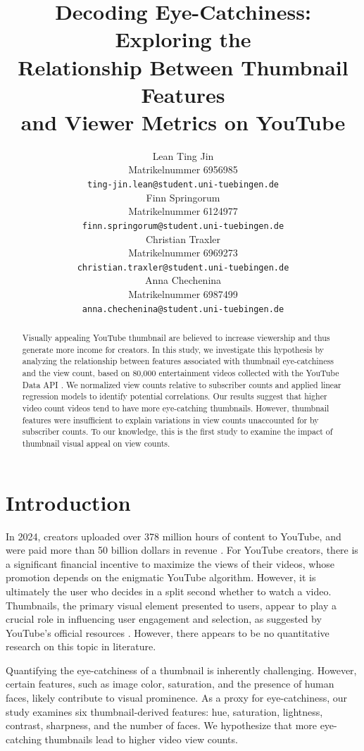 \documentclass{article}
\title{Decoding Eye-Catchiness: Exploring the\\Relationship Between Thumbnail Features\\and Viewer Metrics on YouTube}
\author{%
  Lean Ting Jin\\
  Matrikelnummer 6956985\\
  \fontsize{8.5}{11}\texttt{ting-jin.lean@student.uni-tuebingen.de} \\
  \And
  Finn Springorum\\
  Matrikelnummer 6124977\\
  \fontsize{8.5}{11}\texttt{finn.springorum@student.uni-tuebingen.de} \\
  \And
  Christian Traxler\\
  Matrikelnummer 6969273\\
  \fontsize{8.5}{11}\texttt{christian.traxler@student.uni-tuebingen.de} \\
  \And
  Anna Chechenina\\
  Matrikelnummer 6987499\\
  \fontsize{8.5}{11}\texttt{anna.chechenina@student.uni-tuebingen.de} \\
}
\begin{document}
\maketitle

\begin{abstract}
Visually appealing YouTube thumbnail are believed to increase viewership and thus generate more income for creators. In this study, we investigate this hypothesis by analyzing the relationship between features associated with thumbnail eye-catchiness and the view count, based on 80,000 entertainment videos collected with the YouTube Data API \cite{youtubeapi}. We normalized view counts relative to subscriber counts and applied linear regression models to identify potential correlations. Our results suggest that higher video count videos tend to have more eye-catching thumbnails. However, thumbnail features were insufficient to explain variations in view counts unaccounted for by subscriber counts. To our knowledge, this is the first study to examine the impact of thumbnail visual appeal on view counts.
\end{abstract}

\section{Introduction}
In 2024, creators uploaded over 378 million hours of content to YouTube, and were paid more than 50 billion dollars in revenue \cite{youtube-stats}. For YouTube creators, there is a significant financial incentive to maximize the views of their videos, whose promotion depends on the enigmatic YouTube algorithm. However, it is ultimately the user who decides in a split second whether to watch a video. Thumbnails, the primary visual element presented to users, appear to play a crucial role in influencing user engagement and selection, as suggested by YouTube's official resources \cite{YouTubeThumbnail}. However, there appears to be no quantitative research on this topic in literature.

Quantifying the eye-catchiness of a thumbnail is inherently challenging. However, certain features, such as image color, saturation, and the presence of human faces, likely contribute to visual prominence. As a proxy for eye-catchiness, our study examines six thumbnail-derived features: hue, saturation, lightness, contrast, sharpness, and the number of faces. We hypothesize that more eye-catching thumbnails lead to higher video view counts.
\end{document}
